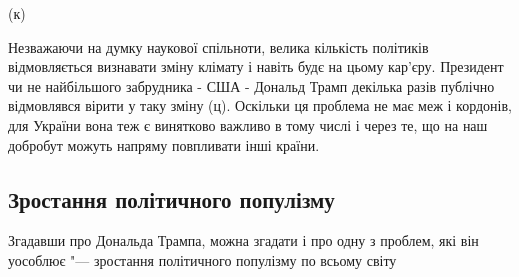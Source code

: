         (к)

        Незважаючи на думку наукової спільноти, велика кількість політиків відмовляється визнавати зміну клімату і навіть будє на цьому
        кар'єру. Президент чи не найбільшого забрудника - США - Дональд Трамп декілька разів публічно відмовлявся вірити у таку зміну (ц).
        Оскільки ця проблема не має меж і кордонів, для України вона теж є винятково важливо в тому числі і через те, що на наш добробут
        можуть напряму повпливати інші країни.

    \subsection{Зростання політичного популізму}

        Згадавши про Дональда Трампа, можна згадати і про одну з проблем, які він уособлює "--- зростання політичного популізму 
        по всьому світу